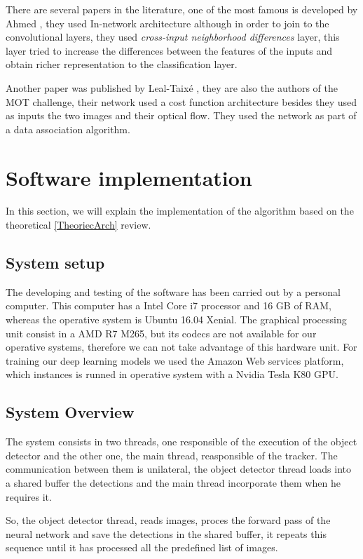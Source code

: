 \documentclass[12pt, a4paper, titlepage,twoside,openright]{article}
\begin{document}
There are several papers in the literature, one of the most famous is developed by Ahmed \cite{ahmed}, they used In-network architecture although in order to join to the convolutional layers, they used \textit{cross-input neighborhood differences} layer, this layer tried to increase the differences between the features of the inputs and obtain richer representation to the classification layer.

Another paper was published by Leal-Taixé \cite{lealTaixe}, they are also the authors of the MOT challenge, their network used a cost function architecture besides they used as inputs the two images and their optical flow. They used the network as part of a data association algorithm.


\section{Software implementation}

In this section, we will explain the implementation of the algorithm based on the theoretical \ref{TheoriecArch} review.

\subsection{System setup}

The developing and testing of the software has been carried out by a personal computer. This computer has a Intel Core i7 processor and 16 GB of RAM, whereas the operative system is Ubuntu 16.04 Xenial. The graphical processing unit consist in a AMD R7 M265, but its codecs are not available for our operative systems, therefore we can not take advantage of this hardware unit. For training our deep learning models we used the Amazon Web services platform, which instances is runned in operative system with a Nvidia Tesla K80 GPU. 


\subsection{System Overview}


The system consists in two threads, one responsible of the execution of the object detector and the other one, the main thread, reasponsible of the tracker. The communication between them is unilateral, the object detector thread loads into a shared buffer the detections and the main thread incorporate them when he requires it.

So, the object detector thread, reads images, proces the forward pass of the neural network and save the detections in the shared buffer, it repeats this sequence until it has processed all the predefined list of images.
\end{document}
